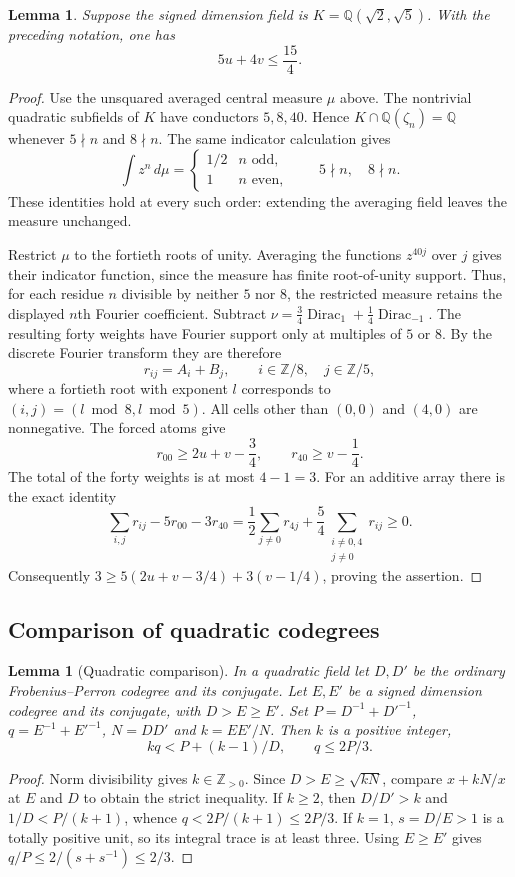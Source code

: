 \documentclass[11pt,a4paper]{article}
\newtheorem{lemma}[theorem]{Lemma}
\theoremstyle{definition}\newtheorem{definition}[theorem]{Definition}
\theoremstyle{remark}\newtheorem{remark}[theorem]{Remark}
\newcommand{\Q}{\mathbb Q}
\newcommand{\ZZ}{\mathbb Z}
\numberwithin{equation}{section}
\begin{document}
\begin{lemma}\label{core:lem:sqrt5-periodic-moments}
Suppose the signed dimension field is $K=\Q(\sqrt2,\sqrt5)$.
With the preceding notation, one has
\[
 5u+4v\le\frac{15}{4}.
\]
\end{lemma}
\begin{proof}
Use the unsquared averaged central measure $\mu$ above.
The nontrivial quadratic subfields of $K$ have conductors $5,8,40$.
Hence $K\cap\Q(\zeta_n)=\Q$ whenever $5\nmid n$ and
$8\nmid n$. The same indicator calculation gives
\[
 \int z^n\,d\mu=\begin{cases}1/2&n\text{ odd},\\1&n\text{ even},\end{cases}
 \qquad 5\nmid n,\quad8\nmid n.
\]
These identities hold at every such order: extending the averaging
field leaves the measure unchanged.

Restrict $\mu$ to the fortieth roots of unity. Averaging the functions
$z^{40j}$ over $j$ gives their indicator function, since the measure
has finite root-of-unity support. Thus, for each residue $n$ divisible
by neither $5$ nor $8$, the restricted measure retains the displayed
$n$th Fourier coefficient. Subtract
$\nu=\tfrac34\operatorname{Dirac}_1+\tfrac14\operatorname{Dirac}_{-1}$.
The resulting forty weights have Fourier support only at multiples
of $5$ or $8$. By the discrete Fourier transform they are therefore
\[
 r_{ij}=A_i+B_j,\qquad i\in\ZZ/8,\quad j\in\ZZ/5,
\]
where a fortieth root with exponent $l$ corresponds to
$(i,j)=(l\bmod8,l\bmod5)$.
All cells other than $(0,0)$ and $(4,0)$ are nonnegative. The forced
atoms give
\[
 r_{00}\ge2u+v-\frac34,\qquad
 r_{40}\ge v-\frac14.
\]
The total of the forty weights is at most $4-1=3$.
For an additive array there is the exact identity
\[
 \sum_{i,j}r_{ij}-5r_{00}-3r_{40}
 =\frac12\sum_{j\ne0}r_{4j}
  +\frac54\sum_{\substack{i\ne0,4\\j\ne0}}r_{ij}\ge0.
\]
Consequently
$3\ge5(2u+v-3/4)+3(v-1/4)$, proving the assertion.
\end{proof}
\subsection{Comparison of quadratic codegrees}
\begin{lemma}[Quadratic comparison]\label{core:lem:family-comparison}
In a quadratic field let $D,D'$ be the ordinary Frobenius--Perron
codegree and its conjugate. Let $E,E'$ be a signed dimension
codegree and its conjugate, with $D>E\ge E'$. Set
$P=D^{-1}+D'^{-1}$, $q=E^{-1}+E'^{-1}$, $N=DD'$ and
$k=EE'/N$. Then $k$ is a positive integer,
\begin{equation}\label{core:quadratic-strict}
 kq<P+(k-1)/D,\qquad q\le2P/3.
\end{equation}
\end{lemma}
\begin{proof}
Norm divisibility gives $k\in\ZZ_{>0}$. Since
$D>E\ge\sqrt{kN}$, compare $x+kN/x$ at $E$ and $D$ to obtain
the strict inequality. If $k\ge2$, then $D/D'>k$ and
$1/D<P/(k+1)$, whence $q<2P/(k+1)\le2P/3$.
If $k=1$, $s=D/E>1$ is a totally positive unit, so its integral
trace is at least three. Using $E\ge E'$ gives
$q/P\le2/(s+s^{-1})\le2/3$.
\end{proof}
\end{document}

